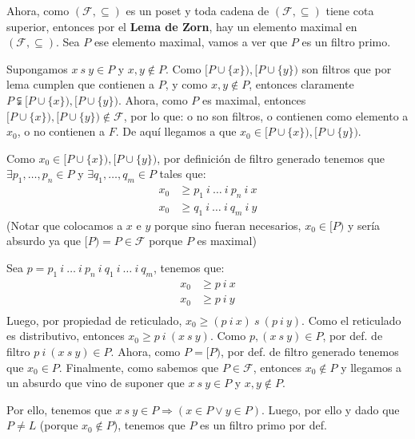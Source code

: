 \documentclass{article}
\begin{document}
Ahora, como $(\mathcal{F},\subseteq)$ es un poset y toda cadena de $(\mathcal{F},\subseteq)$ tiene cota superior, entonces por el \textbf{Lema de Zorn}, hay un elemento maximal en $(\mathcal{F},\subseteq)$. Sea $P$ ese elemento maximal, vamos a ver que $P$ es un filtro primo.

Supongamos $x\ s\ y\in P$ y $x,y\notin P$. Como $[P\cup\{x\}),[P\cup\{y\})$ son filtros que por lema cumplen que contienen a $P$, y como $x,y\notin P$, entonces claramente $P\subsetneqq [P\cup\{x\}),[P\cup\{y\})$. Ahora, como $P$ es maximal, entonces $[P\cup\{x\}),[P\cup\{y\})\notin\mathcal{F}$, por lo que: o no son filtros, o contienen como elemento a $x_0$, o no contienen a $F$. De aquí llegamos a que $x_0\in [P\cup\{x\}),[P\cup\{y\})$.

Como $x_0\in[P\cup\{x\}),[P\cup\{y\})$, por definición de filtro generado tenemos que $\exists p_1,\dots,p_n\in P$ y $\exists q_1,\dots,q_m\in P$ tales que:
\begin{equation*}
  \begin{aligned}
    x_0 & \geq p_1\ i\ \dots\ i\ p_n\ i\ x \\
    x_0 & \geq q_1\ i\ \dots\ i\ q_m\ i\ y
  \end{aligned}
\end{equation*}
(Notar que colocamos a $x$ e $y$ porque sino fueran necesarios, $x_0\in [P)$ y sería absurdo ya que $[P)=P\in\mathcal{F}$ porque $P$ es maximal)

Sea $p=p_1\ i\ \dots\ i\ p_n\ i\ q_1\ i\ \dots\ i\ q_m$, tenemos que:
\begin{equation*}
  \begin{aligned}
    x_0 & \geq p\ i\ x \\
    x_0 & \geq p\ i\ y \\
  \end{aligned}
\end{equation*}
Luego, por propiedad de reticulado, $x_0\geq (p\ i\ x)\ s\ (p\ i\ y)$. Como el reticulado es distributivo, entonces $x_0\geq p\ i\ (x\ s\ y)$. Como $p,(x\ s\ y)\in P$, por def. de filtro $p\ i\ (x\ s\ y)\in P$. Ahora, como $P=[P)$, por def. de filtro generado tenemos que $x_0\in P$. Finalmente, como sabemos que $P\in\mathcal{F}$, entonces $x_0\notin P$ y llegamos a un absurdo que vino de suponer que $x\ s\ y\in P$ y $x,y\notin P$.

Por ello, tenemos que $x\ s\ y\in P\Rightarrow(x\in P\lor y\in P)$. Luego, por ello y dado que $P\neq L$ (porque $x_0\notin P$), tenemos que $P$ es un filtro primo por def.
\end{document}
